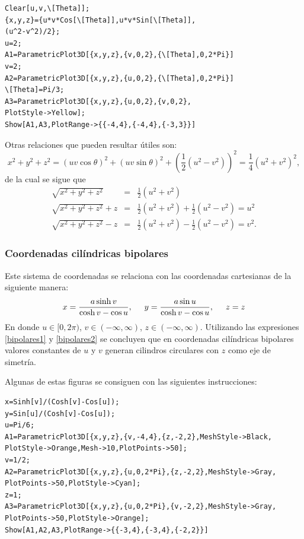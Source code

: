 \begin{tcolorbox}[title=\bf Instrucción \verb"Mathematica"]\begin{Verbatim}[formatcom=\letraverbatim]
Clear[u,v,\[Theta]];
{x,y,z}={u*v*Cos[\[Theta]],u*v*Sin[\[Theta]],
(u^2-v^2)/2};
u=2;
A1=ParametricPlot3D[{x,y,z},{v,0,2},{\[Theta],0,2*Pi}]
v=2;
A2=ParametricPlot3D[{x,y,z},{u,0,2},{\[Theta],0,2*Pi}]
\[Theta]=Pi/3;
A3=ParametricPlot3D[{x,y,z},{u,0,2},{v,0,2},
PlotStyle->Yellow];
Show[A1,A3,PlotRange->{{-4,4},{-4,4},{-3,3}}]
\end{Verbatim}
\end{tcolorbox}

Otras relaciones que pueden resultar útiles son:
\[x^2+y^2+z^2=\left( uv\cos \theta \right) ^2+\left( uv\sin \theta
\right) ^2+\left( \frac{1}{2}\left( u^2-v^2\right) \right) ^2= \frac{1}{4}\left( u^2+v^2\right) ^2,\]
de la cual se sigue que
\begin{eqnarray*}
\sqrt{x^2+y^2+z^2}&=&\frac{1}{2}\left( u^2+v^2\right) \\
\sqrt{x^2+y^2+z^2}+z &=& \frac{1}{2}\left( u^2+v^2\right) +\frac{1}{2}\left( u^2-v^2\right) = u^2\\
\sqrt{x^2+y^2+z^2}-z &=& \frac{1}{2}\left( u^2+v^2\right) -\frac{1}{2}\left( u^2-v^2\right) = v^2.
\end{eqnarray*}

\subsubsection{Coordenadas cilíndricas bipolares} 
Este sistema de coordenadas se relaciona con las coordenadas cartesianas de la siguiente manera:
\begin{equation}
x = \frac{a\sinh v}{\cosh v-\cos u},\hskip0.5cm y =\frac{a\sin u}{\cosh v-\cos u}, \hskip0.5cm z = z
\end{equation}
En donde $u\in \lbrack 0,2\pi )$, $v\in (-\infty ,\infty )$, $z\in (-\infty,\infty )$.
Utilizando las expresiones \ref{bipolares1} y \ref{bipolares2} se concluyen que en
coordenadas cilíndricas bipolares valores constantes de $u$ y $v$ generan cilindros circulares con $z$ como eje de simetría.

Algunas de estas figuras se consiguen con las siguientes instrucciones:

\begin{tcolorbox}[title=\bf Instrucción \verb"Mathematica"]\begin{Verbatim}[formatcom=\letraverbatim]
x=Sinh[v]/(Cosh[v]-Cos[u]);
y=Sin[u]/(Cosh[v]-Cos[u]);
u=Pi/6;
A1=ParametricPlot3D[{x,y,z},{v,-4,4},{z,-2,2},MeshStyle->Black,
PlotStyle->Orange,Mesh->10,PlotPoints->50];
v=1/2;
A2=ParametricPlot3D[{x,y,z},{u,0,2*Pi},{z,-2,2},MeshStyle->Gray,
PlotPoints->50,PlotStyle->Cyan];
z=1;
A3=ParametricPlot3D[{x,y,z},{u,0,2*Pi},{v,-2,2},MeshStyle->Gray,
PlotPoints->50,PlotStyle->Orange];
Show[A1,A2,A3,PlotRange->{{-3,4},{-3,4},{-2,2}}]
\end{Verbatim}
\end{tcolorbox}

